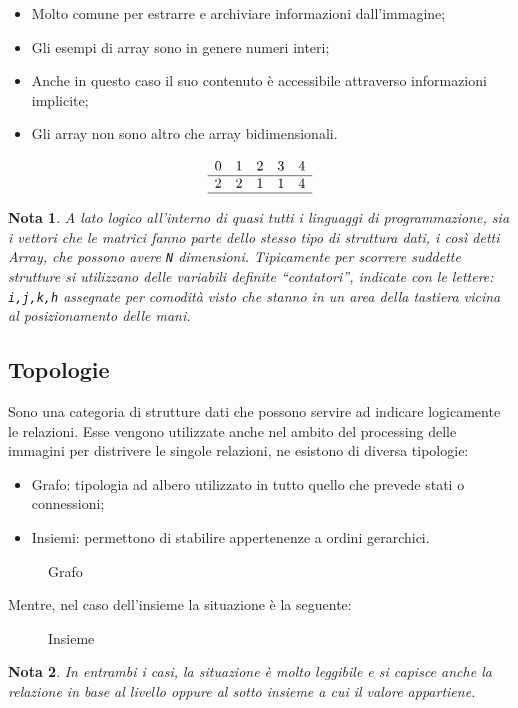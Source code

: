 \documentclass{report}
\newtheorem{nota}{Nota}
\begin{document}
\begin{itemize}
\item Molto comune per estrarre e archiviare informazioni dall'immagine;
\item Gli esempi di array sono in genere numeri interi;
\item Anche in questo caso il suo contenuto è accessibile attraverso
  informazioni implicite;
\item Gli array non sono altro che array bidimensionali.
\end{itemize}
\begin{equation}
  \label{eq:vettore}
  \begin{array}{ccccc}
    0&1&2&3&4\\\hline
    2&2&1&1&4\\\hline
  \end{array}
\end{equation}
\begin{nota}
  A lato logico all'interno di quasi tutti i linguaggi di
  programmazione, sia i vettori che le matrici fanno parte dello stesso
  tipo di struttura dati, i così detti Array, che possono avere
  \texttt{N} dimensioni. Tipicamente per scorrere suddette strutture si
  utilizzano delle variabili definite ``contatori'', indicate con le
  lettere: \texttt{i,j,k,h} assegnate per comodità visto che stanno in
  un area della tastiera vicina al posizionamento delle mani.
\end{nota}

\subsection{Topologie}
\label{sec:topologie}
Sono una categoria di strutture dati che possono servire ad indicare
logicamente le relazioni. Esse vengono utilizzate anche nel ambito
del processing delle immagini per distrivere le singole relazioni,
ne esistono di diversa tipologie:
\begin{itemize}
\item Grafo: tipologia ad albero utilizzato in tutto quello che prevede
  stati o connessioni;
\item Insiemi: permettono di stabilire appertenenze a ordini gerarchici.
\end{itemize}
\begin{figure}[ht!]
  \centering
  
  \caption{Grafo}
  \label{fig:grafo}
\end{figure}
Mentre, nel caso dell'insieme la situazione è la seguente:
\begin{figure}[ht!]
  \centering
  \resizebox{8cm}{!}{
  }
  \caption{Insieme}
  \label{fig:insieme}
\end{figure}
\begin{nota}
  In entrambi i casi, la situazione è molto leggibile e si capisce
  anche la relazione in base al livello oppure al sotto insieme a cui
  il valore appartiene.
\end{nota}
\end{document}
